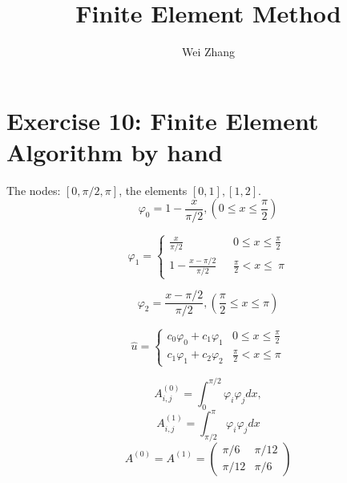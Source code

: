 \documentclass{article}
\begin{document}
\title{Finite Element Method}
\author{Wei Zhang}
\large
\maketitle

\section{Exercise 10: Finite Element Algorithm by hand}
The nodes: $[0, \pi/2, \pi]$, the elements $[0, 1],[1, 2]$.
\begin{equation*}
\displaystyle\varphi_{0}=1-\frac{x}{\displaystyle \pi/2},     ( 0\leq x\leq\frac{\pi}{2})
\end{equation*}

\begin{equation*}
\displaystyle\varphi_{1}=
\begin{cases}
\displaystyle\frac{x}{\pi/2} & \text{ $\displaystyle0\leq x\leq\frac{\pi}{2}$}\\
\displaystyle 1-\frac{x-\pi/2}{\pi/2} & \text{ $\displaystyle\frac{\pi}{2}< x\leq\ \pi$}
\end{cases}
\end{equation*}

\begin{equation*}
\displaystyle\varphi_{2}=\frac{x-\pi/2}{\pi/2},     ( \frac{\pi}{2}\leq x\leq\pi)
\end{equation*}


\begin{equation}
\hat{u}=
\begin{cases}
c_{0}\varphi_{0}+c_{1}\varphi_{1}& \text{$\displaystyle 0 \leq x \leq \frac{\pi}{2}$}\\
c_{1}\varphi_{1}+c_{2}\varphi_{2}& \text{$\displaystyle \frac{\pi}{2}< x \leq \pi$}

\end{cases}
\end{equation}

\begin{equation*}
A_{i,j}^{(0)}=\displaystyle\int^{\pi/2}_{0}{\varphi}_{i}{\varphi}_{j}dx,
\end{equation*}
\begin{equation*}
A_{i,j}^{(1)}=\displaystyle\int^{\pi}_{\pi/2}{\varphi}_{i}{\varphi}_{j}dx
\end{equation*}
\begin{equation*}
A^{(0)}=A^{(1)}=\begin{pmatrix}
\pi/6 & \pi/12\\
\pi/12 & \pi/6
\end{pmatrix}
\end{equation*}
\end{document}
